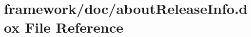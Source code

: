 \hypertarget{about_release_info_8dox}{}\section{framework/doc/about\+Release\+Info.dox File Reference}
\label{about_release_info_8dox}
